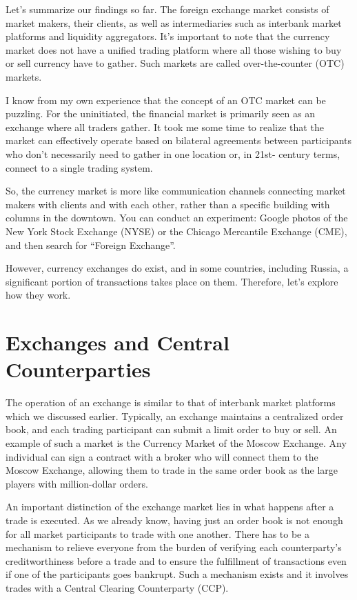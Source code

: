 \documentclass[a4paper,14pt]{extarticle}
\begin{document}
Let's summarize our findings so far. The foreign exchange market consists of 
market makers, their clients, as well as intermediaries such as interbank market 
platforms and liquidity aggregators. It's important to note that the currency 
market does not have a unified trading platform where all those wishing to buy 
or sell currency have to gather. Such markets are called over-the-counter (OTC) 
markets.

I know from my own experience that the concept of an OTC market can be 
puzzling. For the uninitiated, the financial market is primarily seen as an 
exchange where all traders gather. It took me some time to realize that the 
market can effectively operate based on bilateral agreements between 
participants who don't necessarily need to gather in one location or, in 21st-
century terms, connect to a single trading system.

So, the currency market is more like communication channels connecting market 
makers with clients and with each other, rather than a specific building with 
columns in the downtown. You can conduct an experiment: Google photos of the 
New York Stock Exchange (NYSE) or the Chicago Mercantile Exchange (CME), and 
then search for ``Foreign Exchange''.

However, currency exchanges do exist, and in some countries, including Russia, a 
significant portion of transactions takes place on them. Therefore, let's 
explore how they work.

\section*{Exchanges and Central Counterparties}

The operation of an exchange is similar to that of interbank market platforms 
which we discussed earlier. Typically, an exchange maintains a centralized order 
book, and each trading participant can submit a limit order to buy or sell. An 
example of such a market is the Currency Market of the Moscow Exchange. Any 
individual can sign a contract with a broker who will connect them to the Moscow 
Exchange, allowing them to trade in the same order book as the large players 
with million-dollar orders.

An important distinction of the exchange market lies in what happens after a 
trade is executed. As we already know, having just an order book is not enough 
for all market participants to trade with one another. There has to be a 
mechanism to relieve everyone from the burden of verifying each counterparty's 
creditworthiness before a trade and to ensure the fulfillment of transactions 
even if one of the participants goes bankrupt. Such a mechanism exists and it 
involves trades with a Central Clearing Counterparty (CCP).
\end{document}
